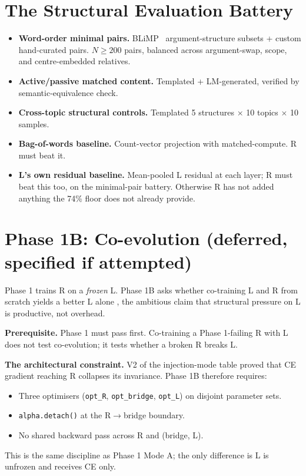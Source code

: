 \documentclass[10pt, twocolumn, a4paper]{article}
\begin{document}
\section{The Structural Evaluation Battery}

\begin{itemize}[nosep,leftmargin=*]
\item \textbf{Word-order minimal pairs.} BLiMP~\cite{blimp} argument-structure subsets + custom hand-curated pairs. $N \geq 200$ pairs, balanced across argument-swap, scope, and centre-embedded relatives.
\item \textbf{Active/passive matched content.} Templated + LM-generated, verified by semantic-equivalence check.
\item \textbf{Cross-topic structural controls.} Templated 5 structures $\times$ 10 topics $\times$ 10 samples.
\item \textbf{Bag-of-words baseline.} Count-vector projection with matched-compute. R must beat it.
\item \textbf{L's own residual baseline.} Mean-pooled L residual at each layer; R must beat this too, on the minimal-pair battery. Otherwise R has not added anything the 74\% floor does not already provide.
\end{itemize}


\section{Phase 1B: Co-evolution (deferred, specified if attempted)}

Phase 1 trains R on a \emph{frozen} L. Phase 1B asks whether co-training L and R from scratch yields a better L alone ,  the ambitious claim that structural pressure on L is productive, not overhead.

\textbf{Prerequisite.} Phase 1 must pass first. Co-training a Phase 1-failing R with L does not test co-evolution; it tests whether a broken R breaks L.

\textbf{The architectural constraint.} V2 of the injection-mode table proved that CE gradient reaching R collapses its invariance. Phase 1B therefore requires:
\begin{itemize}[nosep]
\item Three optimisers (\texttt{opt\_R}, \texttt{opt\_bridge}, \texttt{opt\_L}) on disjoint parameter sets.
\item \texttt{alpha.detach()} at the R$\to$bridge boundary.
\item No shared backward pass across R and (bridge, L).
\end{itemize}
This is the same discipline as Phase 1 Mode A; the only difference is L is unfrozen and receives CE only.
\end{document}
